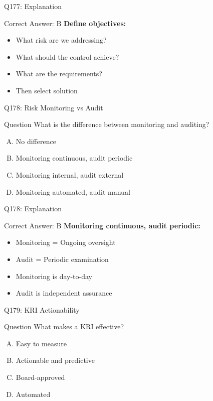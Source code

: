 \documentclass{beamer}
\begin{document}
	\begin{frame}{Q177: Explanation}
		\begin{block}{Correct Answer: B}
			\textbf{Define objectives:}
			\begin{itemize}
				\item What risk are we addressing?
				\item What should the control achieve?
				\item What are the requirements?
				\item Then select solution
			\end{itemize}
		\end{block}
	\end{frame}
	
	\begin{frame}{Q178: Risk Monitoring vs Audit}
		\begin{block}{Question}
			What is the difference between monitoring and auditing?
		\end{block}
		\begin{enumerate}[(A)]
			\item No difference
			\item Monitoring continuous, audit periodic
			\item Monitoring internal, audit external
			\item Monitoring automated, audit manual
		\end{enumerate}
	\end{frame}
	
	\begin{frame}{Q178: Explanation}
		\begin{block}{Correct Answer: B}
			\textbf{Monitoring continuous, audit periodic:}
			\begin{itemize}
				\item Monitoring = Ongoing oversight
				\item Audit = Periodic examination
				\item Monitoring is day-to-day
				\item Audit is independent assurance
			\end{itemize}
		\end{block}
	\end{frame}
	
	\begin{frame}{Q179: KRI Actionability}
		\begin{block}{Question}
			What makes a KRI effective?
		\end{block}
		\begin{enumerate}[(A)]
			\item Easy to measure
			\item Actionable and predictive
			\item Board-approved
			\item Automated
		\end{enumerate}
	\end{frame}
	
\end{document}
